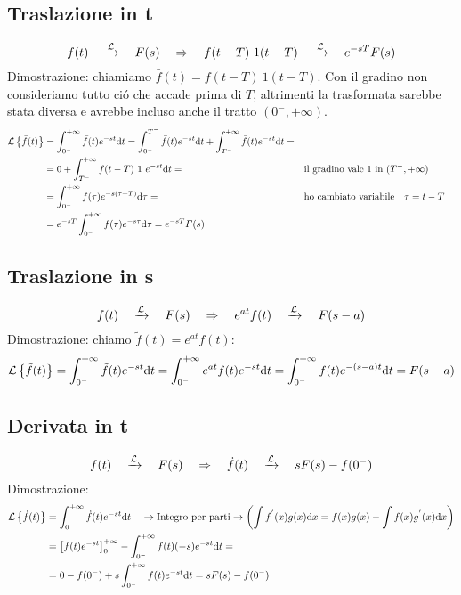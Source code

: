 \documentclass[../main.tex]{subfiles}
\begin{document}
	\subsection{Traslazione in t}
	\label{trasl_t}
	$$ f(t) \quad \xrightarrow{\mathcal{L}} \quad F(s) \quad \Rightarrow \quad f(t-T)\ 1(t-T) \quad \xrightarrow{\mathcal{L}} \quad e^{-sT}F(s) $$
	\linebreak
	Dimostrazione: chiamiamo $ \bar{f}(t) = f(t-T)\ 1(t-T) $. Con il gradino non consideriamo tutto ci\'{o} che accade prima di $T$, altrimenti la trasformata sarebbe stata diversa e avrebbe incluso anche il tratto $(0^{-},+ \infty)$.
	\begin{align*}
		\mathcal{L} \left\lbrace \bar{f}(t) \right\rbrace &= \int_{0^{-}}^{+\infty} \bar{f}(t) e^{- s t} \mathrm{d} t = \int_{0^{-}}^{T^{-}} \bar{f}(t) e^{-st} \mathrm{d}t + \int_{T^{-}}^{+ \infty} \bar{f}(t) e^{-st} \mathrm{d}t =\\
		&= 0+ \int_{T^{-}}^{+ \infty} f(t-T)\ 1\ e^{-st} \mathrm{d}t=
		&&\text{il gradino vale 1 in } (T^{-},+ \infty) \\
		&= \int_{0^{-}}^{+ \infty} f(\tau) e^{-s(\tau+T)} \mathrm{d}\tau = &&\text{ho cambiato variabile} \quad \tau=t-T\\
		&= e^{-sT} \int_{0^{-}}^{+\infty} f(\tau) e^{- s \tau} \mathrm{d} \tau = e^{-sT} F(s)
	\end{align*}
	\subsection{Traslazione in s}
	\label{trasl_s}
	$$ f(t) \quad \xrightarrow{\mathcal{L}} \quad F(s) \quad \Rightarrow \quad e^{at}f(t) \quad \xrightarrow{\mathcal{L}} \quad F(s-a)$$
	Dimostrazione: chiamo $\tilde{f}(t) = e^{at} f(t) $:\\
	\[
		\mathcal{L} \left\lbrace \tilde{f}(t) \right\rbrace = \int_{0^{-}}^{+\infty} \tilde{f}(t) e^{- s t} \mathrm{d} t = \int_{0^{-}}^{+\infty} e^{at}f(t) e^{- s t} \mathrm{d} t = \int_{0^{-}}^{+ \infty} f(t) e^{-(s-a)t} \mathrm{d}t = F(s-a)
	\]
	\subsection{Derivata in t}
	\label{deriv_t}
	$$ f(t) \quad \xrightarrow{\mathcal{L}} \quad F(s) \quad \Rightarrow \quad \dot{f}(t) \quad \xrightarrow{\mathcal{L}} \quad sF(s)-f(0^{-}) $$
	Dimostrazione:
	\begin{align*}
		\mathcal{L} \left\lbrace \dot{f}(t) \right\rbrace &= \int_{0^{-}}^{+\infty} \dot{f}(t) e^{- s t} \mathrm{d} t \quad \rightarrow \text{Integro per parti} \rightarrow \left( \int f^{'}(x)g(x)\mathrm{d}x = f(x)g(x) - \int f(x)g^{'}(x) \mathrm{d}x \right)\\
		&= \left[ f(t)e^{-st} \right]_{0^{-}}^{+\infty} - \int_{0^{-}}^{+\infty} f(t)(-s) e^{- s t} \mathrm{d} t =\\
		&= 0 - f(0^{-}) + s \int_{0^{-}}^{+\infty} f(t) e^{- s t} \mathrm{d} t = sF(s)-f(0^{-})
	\end{align*}
\end{document}
